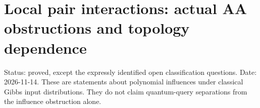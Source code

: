 \section{Local pair interactions: actual AA obstructions and topology
dependence}\label{proof:local_interactions}

Status: proved, except the expressly identified open classification
questions. Date: 2026-11-14. These are statements about polynomial
influences under classical Gibbs input distributions. They do not claim
quantum-query separations from the influence obstruction alone.












